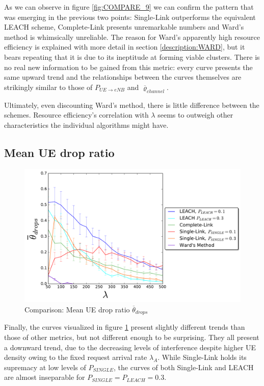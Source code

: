 As we can observe in figure \ref{fig:COMPARE_9} we can confirm the pattern that was emerging in the previous two points: Single-Link outperforms the equivalent LEACH scheme, Complete-Link presents unremarkable numbers and Ward's method is whimsically unreliable. The reason for Ward's apparently high resource efficiency is explained with more detail in section \ref{description:WARD}, but it bears repeating that it is due to its ineptitude at forming viable clusters. There is no real new information to be gained from this metric: every curve presents the same upward trend and the relationships between the curves themselves are strikingly similar to those of $P_{UE\rightarrow eNB}$ and $\overline{\varrho}_{channel}$. 

Ultimately, even discounting Ward's method, there is little difference between the schemes. Resource efficiency's correlation with $\lambda$ seems to outweigh other characteristics the individual algorithms might have.

\subsection{Mean UE drop ratio}

\begin{figure}[H]
\centering
\captionsetup{justification=centering}
\includegraphics[width=1\linewidth]{figures/COMPARE_10}
\caption{Comparison: Mean UE drop ratio $\overline{\theta}_{drops}$}
\label{fig:COMPARE_10}
\end{figure}

Finally, the curves visualized in figure \ref{fig:COMPARE_10} present slightly different trends than those of other metrics, but not different enough to be surprising. They all present a downward trend, due to the decreasing levels of interference despite higher UE density owing to the fixed request arrival rate $\lambda_A$. While Single-Link holds its supremacy at low levels of $P_{SINGLE}$, the curves of both Single-Link and LEACH are almost inseparable for $P_{SINGLE} = P_{LEACH} = 0.3$. 

